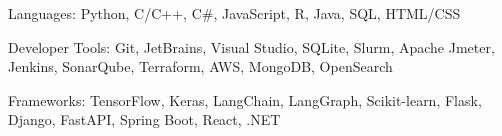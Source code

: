 
\begin{cvawards}
  \cvaward
    {Languages:} %
    {Python, C/C++, C\#, JavaScript, R, Java, SQL, HTML/CSS} %

  \cvaward
    {Developer Tools:} %
    {Git, JetBrains, Visual Studio, SQLite, Slurm, Apache Jmeter, Jenkins, SonarQube, Terraform, AWS, MongoDB, OpenSearch} %

  \cvaward
    {Frameworks:} %
    {TensorFlow, Keras, LangChain, LangGraph, Scikit-learn, Flask, Django, FastAPI, Spring Boot, React, .NET} %
\end{cvawards}
